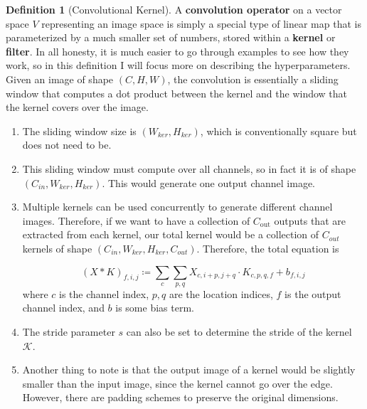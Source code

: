 \documentclass{article}
\theoremstyle{definition}
\theoremstyle{remark}
\theoremstyle{definition}
\newtheorem{definition}{Definition}[section]
\begin{document}
    \begin{definition}[Convolutional Kernel]
      A \textbf{convolution operator} on a vector space $V$ representing an image space is simply a special type of linear map that is parameterized by a much smaller set of numbers, stored within a \textbf{kernel} or \textbf{filter}. In all honesty, it is much easier to go through examples to see how they work, so in this definition I will focus more on describing the hyperparameters. Given an image of shape $(C, H, W)$, the convolution is essentially a sliding window that computes a dot product between the kernel and the window that the kernel covers over the image. 
    \begin{enumerate}
      \item The sliding window size is $(W_{ker}, H_{ker})$, which is conventionally square but does not need to be. 

      \item This sliding window must compute over all channels, so in fact it is of shape $(C_{in}, W_{ker}, H_{ker})$. This would generate one output channel image. 

      \item Multiple kernels can be used concurrently to generate different channel images. Therefore, if we want to have a collection of $C_{\text{out}}$ outputs that are extracted from each kernel, our total kernel would be a collection of $C_{out}$ kernels of shape $(C_{in}, W_{ker}, H_{ker}, C_{out})$. Therefore, the total equation is 

        \[(X \ast K)_{f, i, j} \coloneqq \sum_c \sum_{p, q} X_{c, i + p, j + q} \cdot K_{c, p, q, f} + b_{f, i, j} \]
      where $c$ is the channel index, $p, q$ are the location indices, $f$ is the output channel index, and $b$ is some bias term. 

      \item The stride parameter $s$ can also be set to determine the stride of the kernel $\mathcal{K}$. 

      \item Another thing to note is that the output image of a kernel would be slightly smaller than the input image, since the kernel cannot go over the edge. However, there are padding schemes to preserve the original dimensions. 


\end{enumerate}
\end{definition}
\end{document}
